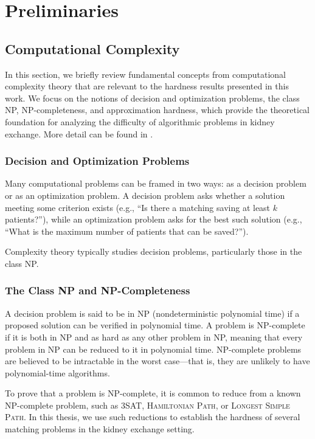 \chapter{Preliminaries}
\label{cha:preliminaries}


\section{Computational Complexity}
\label{sec:computational_complexity}

In this section, we briefly review fundamental concepts from computational complexity theory that are relevant to the hardness results presented in this work. We focus on the notions of decision and optimization problems, the class NP, NP-completeness, and approximation hardness, which provide the theoretical foundation for analyzing the difficulty of algorithmic problems in kidney exchange. More detail can be found in \cite{garey1979computers}.

\subsection*{Decision and Optimization Problems}

Many computational problems can be framed in two ways: as a decision problem or as an optimization problem. A decision problem asks whether a solution meeting some criterion exists (e.g., “Is there a matching saving at least $k$ patients?”), while an optimization problem asks for the best such solution (e.g., “What is the maximum number of patients that can be saved?”).

Complexity theory typically studies decision problems, particularly those in the class NP.

\subsection*{The Class NP and NP-Completeness}

A decision problem is said to be in NP (nondeterministic polynomial time) if a proposed solution can be verified in polynomial time. A problem is NP-complete if it is both in NP and as hard as any other problem in NP, meaning that every problem in NP can be reduced to it in polynomial time. NP-complete problems are believed to be intractable in the worst case—that is, they are unlikely to have polynomial-time algorithms.

To prove that a problem is NP-complete, it is common to reduce from a known NP-complete problem, such as \textsc{3SAT}, \textsc{Hamiltonian Path}, or \textsc{Longest Simple Path}. In this thesis, we use such reductions to establish the hardness of several matching problems in the kidney exchange setting.

